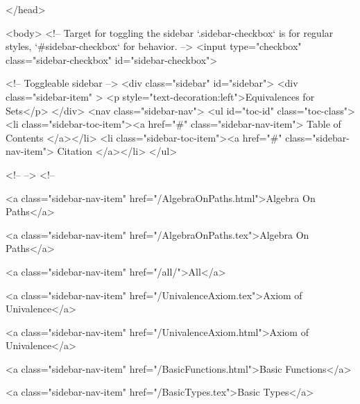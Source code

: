   
</head>




  <body>
    <!-- Target for toggling the sidebar `.sidebar-checkbox` is for regular
     styles, `#sidebar-checkbox` for behavior. -->
<input type="checkbox" class="sidebar-checkbox" id="sidebar-checkbox">

<!-- Toggleable sidebar -->
<div class="sidebar" id="sidebar">
  <div class="sidebar-item" >
    <p style="text-decoration:left">Equivalences for Sets</p>
  </div>
  <nav class="sidebar-nav">
    <ul id="toc-id" class="toc-class">
  <li class="sidebar-toc-item"><a href="#" class="sidebar-nav-item"> Table of Contents </a></li>
  <li class="sidebar-toc-item"><a href="#" class="sidebar-nav-item"> Citation </a></li>
</ul>


    <!--  -->
    <!-- 
      
    
      
    
      
    
      
        
      
    
      
        
          <a class="sidebar-nav-item" href="/AlgebraOnPaths.html">Algebra On Paths</a>
        
      
    
      
        
          <a class="sidebar-nav-item" href="/AlgebraOnPaths.tex">Algebra On Paths</a>
        
      
    
      
        
          <a class="sidebar-nav-item" href="/all/">All</a>
        
      
    
      
        
          <a class="sidebar-nav-item" href="/UnivalenceAxiom.tex">Axiom of Univalence</a>
        
      
    
      
        
          <a class="sidebar-nav-item" href="/UnivalenceAxiom.html">Axiom of Univalence</a>
        
      
    
      
        
          <a class="sidebar-nav-item" href="/BasicFunctions.html">Basic Functions</a>
        
      
    
      
        
          <a class="sidebar-nav-item" href="/BasicTypes.tex">Basic Types</a>
        
